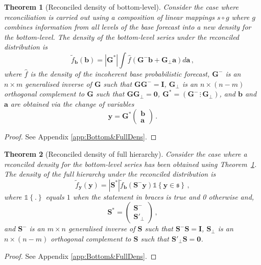 \documentclass[12pt]{article}
\newtheorem{theo}{Theorem}[section]
\theoremstyle{definition}
\begin{document}
\begin{theo}[Reconciled density of bottom-level]\label{theo:bottomdens}
	Consider the case where reconciliation is carried out using a composition of linear mappings $s\circ g$ where $g$ combines information from all levels of the base forecast into a new density for the bottom-level.  The density of the bottom-level series under the reconciled distribution is
	\[
	\tilde{f}_{\bm{b}}(\bm{b})=|\bm{G^*}|\int \hat{f}(\bm{G}^{-}{\bm b}+\bm{G}_\perp {\bm a})d\bm{a}\,,
	\]
	where $\hat{f}$ is the density of the incoherent base probabilistic forecast, $\bm{G^-}$ is an $n\times m$ generalised inverse of $\bm{G}$ such that $\bm{G}\bm{G}^-=\bm{I}$, $\bm{G_\perp}$ is an $n\times (n-m)$ orthogonal complement to $\bm{G}$ such that $\bm{G}\bm{G}_\perp=\bm{0}$, $\bm{G^*}=\left(\bm{G}^-\,\vdots\,\bm{G}_\perp\right)$, and $\bm{b}$ and $\bm{a}$ are obtained via the change of variables
	\[
	\bm{y}=\bm{G^*}\begin{pmatrix}\bm{b}\\\bm{a}\end{pmatrix}\,.
	\]
\end{theo}

\begin{proof}
	See Appendix \ref{app:Bottom&FullDens}.
\end{proof}

\begin{theo}[Reconciled density of full hierarchy]\label{theo:fulldens}
	Consider the case where a reconciled density for the bottom-level series has been obtained using Theorem~\ref{theo:bottomdens}.  The density of the full hierarchy under the reconciled distribution is
	\[
	\tilde{f}_{\bm{y}}(\bm{y})=|\bm{S^*}|\tilde{f}_{\bm b}({\bm{S^-}\bm{y}})\mathbb{1}\left\{\bm{y}\in\mathfrak{s}\right\}\,,
	\]
	where $\mathbb{1}\left\{.\right\}$ equals $1$ when the statement in braces is true and 0 otherwise and,
	\[\bm{S^*}=\begin{pmatrix}\bm{S}^-\\\bm{S}'_\perp\end{pmatrix}\,,\]
	and $\bm{S^-}$ is an $m\times n$ generalised inverse of $\bm{S}$ such that $\bm{S}^-\bm{S}=\bm{I}$, $\bm{S_\perp}$ is an $n\times (n-m)$ orthogonal complement to $\bm{S}$ such that $\bm{S}'_\perp\bm{S}=\bm{0}$.
\end{theo}

\begin{proof}
	See Appendix \ref{app:Bottom&FullDens}.
\end{proof}
\end{document}
